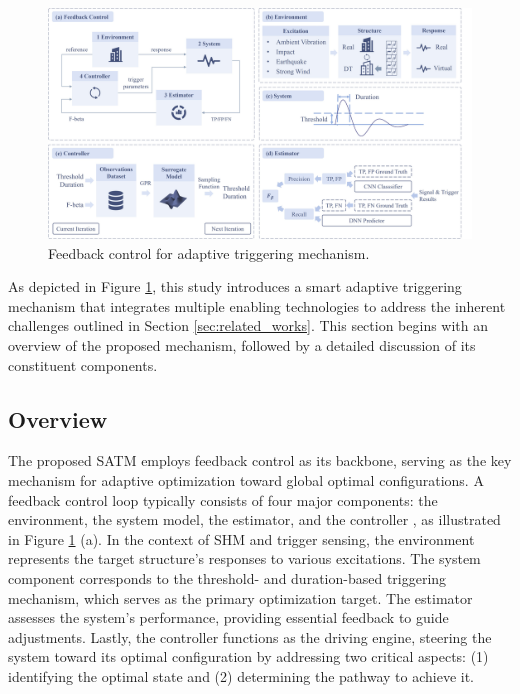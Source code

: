 \documentclass[a4paper,fleqn,numbers,sort&compress]{cas-sc}
\begin{document}
\begin{figure}[htbp]
    \centering
    \includegraphics[width=\linewidth]{Fig5.jpg}
    \caption{Feedback control for adaptive triggering mechanism.}
    \label{fig:SATM}
\end{figure}

As depicted in Figure \ref{fig:SATM}, this study introduces a smart adaptive triggering mechanism that integrates multiple enabling technologies to address the inherent challenges outlined in Section \ref{sec:related_works}. This section begins with an overview of the proposed mechanism, followed by a detailed discussion of its constituent components.

\subsection{Overview}

The proposed SATM employs feedback control as its backbone, serving as the key mechanism for adaptive optimization toward global optimal configurations. A feedback control loop typically consists of four major components: the environment, the system model, the estimator, and the controller \citep{ogata_modern_2010}, as illustrated in Figure \ref{fig:SATM} (a). In the context of SHM and trigger sensing, the environment represents the target structure's responses to various excitations. The system component corresponds to the threshold- and duration-based triggering mechanism, which serves as the primary optimization target. The estimator assesses the system's performance, providing essential feedback to guide adjustments. Lastly, the controller functions as the driving engine, steering the system toward its optimal configuration by addressing two critical aspects: (1) identifying the optimal state and (2) determining the pathway to achieve it.
\end{document}
